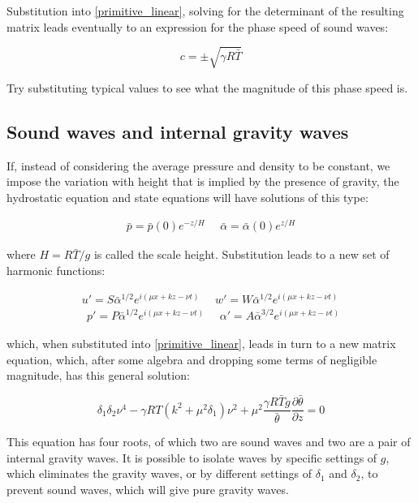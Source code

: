 Substitution into \ref{primitive_linear}, solving for the determinant of the resulting matrix leads eventually to an expression for the phase speed of sound waves:

\begin{equation}
	c = \pm \sqrt{\gamma R \bar{T}}
\end{equation}

\begin{exercise}
Try substituting typical values to see what the magnitude of this phase speed is.
\end{exercise}


\subsection{Sound waves and internal gravity waves}
If, instead of considering the average pressure and density to be constant, we impose the variation with height that is implied by the presence of gravity, the hydrostatic equation and state equations will have solutions of this type:

\begin{eqnarray}
	\bar{p}= \bar{p}(0) e^{-z/H}  ~~~~~~ \bar{\alpha}= \bar{\alpha}(0) e^{z/H}  
\end{eqnarray}

where $H = R\bar{T}/g$ is called the scale height. Substitution leads to a new set of harmonic functions:

\begin{eqnarray}
	u'=S\bar{\alpha}^{1/2} e^{i (\mu x+kz-\nu t)}  ~~~~~~ w'=W\bar{\alpha}^{1/2} e^{i (\mu x+kz-\nu t ) }  \\
~~	p'=P\bar{\alpha}^{1/2} e^{i (\mu x+kz-\nu t)}  ~~~~~~ \alpha'=A\bar{\alpha}^{3/2} e^{i (\mu x+kz-\nu t ) } \nonumber  
\end{eqnarray}

which, when substituted into \ref{primitive_linear}, leads in turn to a new matrix equation, which, after some algebra and dropping some terms of negligible magnitude, has this general solution:

 \begin{equation}
	\delta_1 \delta_2 \nu^4 -\gamma RT(k^2 + \mu^2\delta_1)\nu^2 + \mu^2 \frac{\gamma R \bar{T} g}{\bar{\theta}}\frac{\partial \bar{\theta}}{\partial z} = 0
	\label{GIS_sol.ution}
\end{equation}

This equation has four roots, of which two are sound waves and two are a pair of internal gravity waves. It is possible to isolate waves by specific settings of $g$, which eliminates the gravity waves, or by different settings of $\delta_1$ and $\delta_2$, to prevent sound waves, which will give pure gravity waves.


